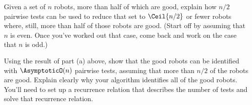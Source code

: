 \documentclass{ks-pset}
\begin{document}
\begin{problem}
  \begin{subproblems}
    \item Given a set of \(n\) robots, more than half of which are good,
      explain how \(n/2\) pairwise tests can be used to reduce that set to
      \(\Ceil{n/2}\) or fewer robots where, still, more than half of those
      robots are good.  (Start off by assuming that \(n\) is even.  Once you've
      worked out that case, come back and work on the case that \(n\) is odd.)
    \item Using the result of part (a) above, show that the good robots can be
      identified with \(\AsymptoticO(n)\) pairwise tests, assuming that more
      than \(n/2\) of the robots are good.  Explain clearly why your algorithm
      identifies all of the good robots.  You'll need to set up a recurrence
      relation that describes the number of tests and solve that recurrence
      relation.
  \end{subproblems}
\end{problem}

\begin{solution}

\end{solution}
\end{document}
